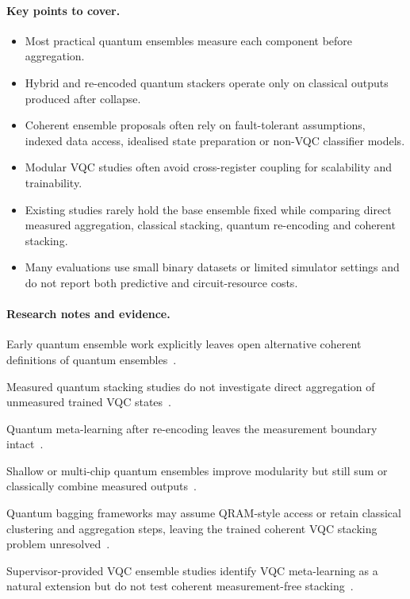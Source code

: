 \documentclass[]{UCD_CS_MSc_AAI_Report}
\newcommand{\gap}[1]{{\color{black}#1}}
\newcommand{\sectionbrief}{\paragraph{Key points to cover.}}
\newcommand{\researchnotes}{\paragraph{Research notes and evidence.}}
\begin{document}
\sectionbrief
\begin{itemize}
    \item Most practical quantum ensembles measure each component before aggregation.
    \item Hybrid and re-encoded quantum stackers operate only on classical outputs produced after collapse.
    \item Coherent ensemble proposals often rely on fault-tolerant assumptions, indexed data access, idealised state preparation or non-VQC classifier models.
    \item Modular VQC studies often avoid cross-register coupling for scalability and trainability.
    \item Existing studies rarely hold the base ensemble fixed while comparing direct measured aggregation, classical stacking, quantum re-encoding and coherent stacking.
    \item Many evaluations use small binary datasets or limited simulator settings and do not report both predictive and circuit-resource costs.
\end{itemize}

\researchnotes
\begin{itemize}
    \gap{\item Early quantum ensemble work explicitly leaves open alternative coherent definitions of quantum ensembles~\cite{schuld_quantum_2018}.}
    \gap{\item Measured quantum stacking studies do not investigate direct aggregation of unmeasured trained VQC states~\cite{vasan_exploring_2025,kang_amino_2025}.}
    \gap{\item Quantum meta-learning after re-encoding leaves the measurement boundary intact~\cite{akrom_bloodbrain_2025,tolotti_ensembles_2024}.}
    \gap{\item Shallow or multi-chip quantum ensembles improve modularity but still sum or classically combine measured outputs~\cite{friedrich_quantum_2025,park_addressing_2025}.}
    \gap{\item Quantum bagging frameworks may assume QRAM-style access or retain classical clustering and aggregation steps, leaving the trained coherent VQC stacking problem unresolved~\cite{rathi_quantum_2025}.}
    \gap{\item Supervisor-provided VQC ensemble studies identify VQC meta-learning as a natural extension but do not test coherent measurement-free stacking~\cite{radojicic_reducing_2026,pinto_composing_2026}.}
\end{itemize}
\end{document}
